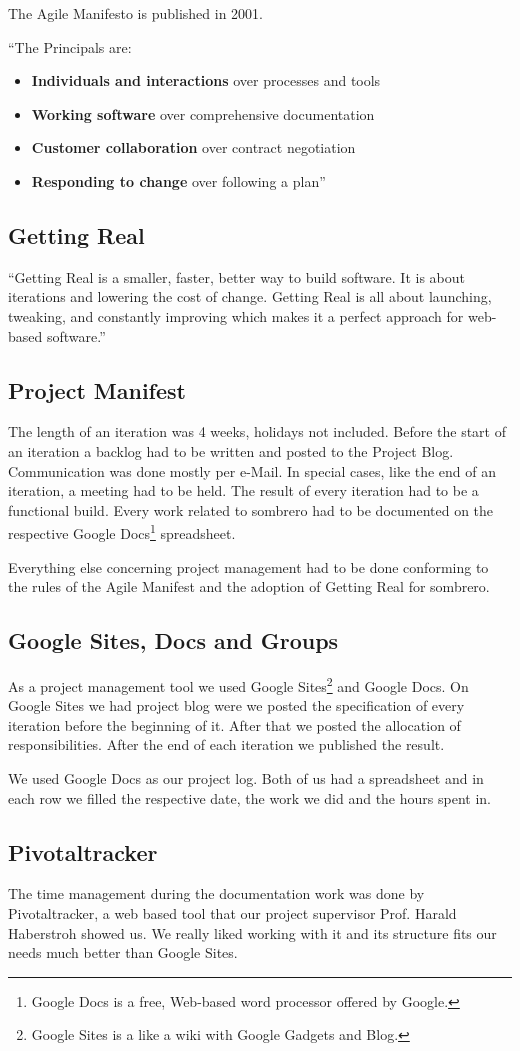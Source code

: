  The Agile Manifesto is published in 2001.

 ``The Principals are:
  \begin{itemize}
    \item \textbf{Individuals and interactions} over processes and tools
    \item \textbf{Working software} over comprehensive documentation
    \item \textbf{Customer collaboration} over contract negotiation
    \item \textbf{Responding to change} over following a plan''\cite{agilemanifesto.org}
  \end{itemize}

\subsection{Getting Real}
    ``Getting Real is a smaller, faster, better way to build software. It is about iterations and lowering the cost of change. Getting Real is all about launching, tweaking, and constantly improving which makes it a perfect approach for web-based software.''\cite{37signals:10}

\subsection{Project Manifest}
    The length of an iteration was 4 weeks, holidays not included. Before the start of an iteration a backlog had to be written and posted to the Project Blog. Communication was done mostly per e-Mail. In special cases, like the end of an iteration, a meeting had to be held. The result of every iteration had to be a functional build. Every work related to sombrero had to be documented on the respective Google Docs\footnote[1]{Google Docs is a free, Web-based word processor offered by Google.} spreadsheet.

    Everything else concerning project management had to be done conforming to the rules of the Agile Manifest and the adoption of Getting Real for sombrero.

\subsection{Google Sites, Docs and Groups}
    As a project management tool we used Google Sites\footnote[2]{Google Sites is a like a wiki with Google Gadgets and Blog.} and Google Docs. On Google Sites we had project blog were we posted the specification of every iteration before the beginning of it. After that we posted the allocation of responsibilities. After the end of each iteration we published the result.

    We used Google Docs as our project log. Both of us had a spreadsheet and in each row we filled the respective date, the work we did and the hours spent in.
\subsection{Pivotaltracker}
    The time management during the documentation work was done by Pivotaltracker, a web based tool that our project supervisor Prof. Harald Haberstroh showed us. We really liked working with it and its structure fits our needs much better than Google Sites.